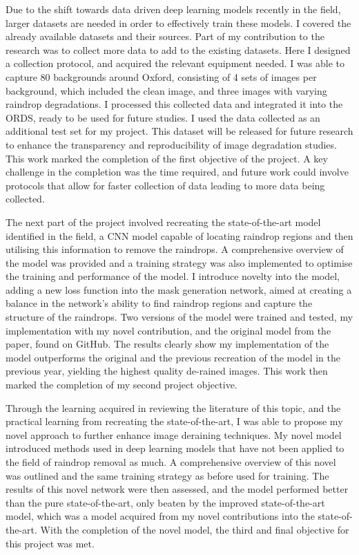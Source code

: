 \documentclass[11pt]{ociamthesis}  %
\begin{document}
Due to the shift towards data driven deep learning models recently in the field, larger datasets are needed in order to effectively train these models. I covered the already available datasets and their sources. Part of my contribution to the research was to collect more data to add to the existing datasets. Here I designed a collection protocol, and acquired the relevant equipment needed. I was able to capture 80 backgrounds around Oxford, consisting of 4 sets of images per background, which included the clean image, and three images with varying raindrop degradations. I processed this collected data and integrated it into the ORDS, ready to be used for future studies. I used the data collected as an additional test set for my project. This dataset will be released for future research to enhance the transparency and reproducibility of image degradation studies. This work marked the completion of the first objective of the project. A key challenge in the completion was the time required, and future work could involve protocols that allow for faster collection of data leading to more data being collected.

The next part of the project involved recreating the state-of-the-art model identified in the field, a CNN model capable of locating raindrop regions and then utilising this information to remove the raindrops. A comprehensive overview of the model was provided and a training strategy was also implemented to optimise the training and performance of the model. I introduce novelty into the model, adding a new loss function into the mask generation network, aimed at creating a balance in the network's ability to find raindrop regions and capture the structure of the raindrops. Two versions of the model were trained and tested, my implementation with my novel contribution, and the original model from the paper, found on GitHub. The results clearly show my implementation of the model outperforms the original and the previous recreation of the model in the previous year, yielding the highest quality de-rained images. This work then marked the completion of my second project objective.

Through the learning acquired in reviewing the literature of this topic, and the practical learning from recreating the state-of-the-art, I was able to propose my novel approach to further enhance image deraining techniques. My novel model introduced methods used in deep learning models that have not been applied to the field of raindrop removal as much. A comprehensive overview of this novel was outlined and the same training strategy as before used for training. The results of this novel network were then assessed, and the model performed better than the pure state-of-the-art, only beaten by the improved state-of-the-art model, which was a model acquired from my novel contributions into the state-of-the-art. With the completion of the novel model, the third and final objective for this project was met.
\end{document}
